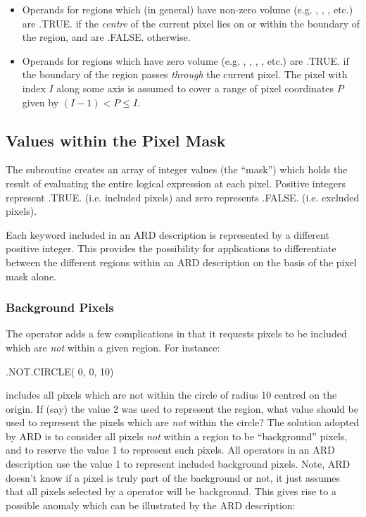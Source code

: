\documentclass[11pt,nolof]{starlink}
\begin{document}
\begin{itemize}

\item Operands for regions which (in general) have non-zero volume (e.g.
,
, , etc.) are .TRUE. if the \emph{centre} of the current pixel lies on or
within the boundary of the region, and are .FALSE. otherwise.

\item Operands for regions which have zero volume (e.g.
,
, , ,
etc.) are .TRUE. if the boundary of the region passes \emph{through} the current
pixel. The pixel with index $I$ along some axis is assumed to cover a range of
pixel coordinates $P$ given by $(I-1) < P \leq I$.

\end{itemize}

\subsection{Values within the Pixel Mask}
The  subroutine creates an array of integer values (the ``mask'') which
holds the result of evaluating the entire logical expression at each pixel.
Positive integers represent .TRUE. (i.e. included pixels) and zero represents
.FALSE. (i.e. excluded pixels).

Each keyword included in an ARD description is represented by a different
positive integer. This provides the possibility for applications to
differentiate between the different regions within an ARD description on the
basis of the pixel mask alone.

\subsubsection{Background Pixels}
The  operator adds a few complications in that it requests pixels to be
included which are \emph{not} within a given region. For instance:

\small
\begin{terminalv}
      .NOT.CIRCLE( 0, 0, 10)
\end{terminalv}
\normalsize

includes all pixels which are not within the circle of radius 10 centred on the
origin. If (say) the value 2 was used to represent the  region, what value
should be used to represent the pixels which are \emph{not} within the circle?
The solution adopted by ARD is to consider all pixels \emph{not} within a region
to be ``background'' pixels, and to reserve the value 1 to represent such
pixels. All  operators in an ARD description use the value 1 to represent
included background pixels. Note, ARD doesn't know if a pixel is truly part of
the background or not, it just assumes that all pixels selected by a 
operator will be background. This gives rise to a possible anomaly which can be
illustrated by the ARD description:
\end{document}
